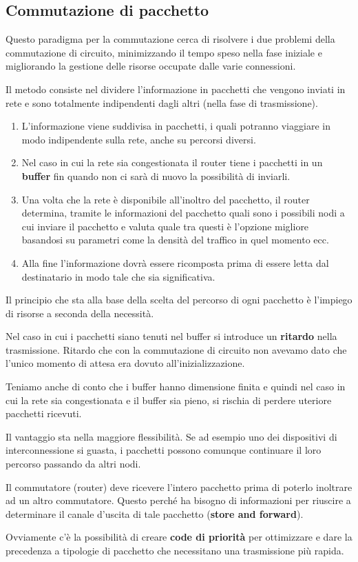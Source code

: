 \subsection{Commutazione di pacchetto}
Questo paradigma per la commutazione cerca di risolvere i due problemi della commutazione di
circuito, minimizzando il tempo speso nella fase iniziale e migliorando la gestione delle risorse
occupate dalle varie connessioni.

Il metodo consiste nel dividere l'informazione in pacchetti che vengono inviati in rete e sono
totalmente indipendenti dagli altri (nella fase di trasmissione).
\begin{enumerate}
	\item L'informazione viene suddivisa in pacchetti, i quali potranno viaggiare in modo
		indipendente sulla rete, anche su percorsi diversi.
	\item Nel caso in cui la rete sia congestionata il router tiene i pacchetti in un
		\textbf{buffer} fin quando non ci sarà di nuovo la possibilità di inviarli.
	\item Una volta che la rete è disponibile all'inoltro del pacchetto, il router determina,
		tramite le informazioni del pacchetto quali sono i possibili nodi a cui inviare il
		pacchetto e valuta quale tra questi è l'opzione migliore basandosi su parametri come la 
		densità del traffico in quel momento ecc.
	\item Alla fine l'informazione dovrà essere ricomposta prima di essere letta dal destinatario
		in modo tale che sia significativa.
\end{enumerate}
Il principio che sta alla base della scelta del percorso di ogni pacchetto è l'impiego di risorse
a seconda della necessità.

Nel caso in cui i pacchetti siano tenuti nel buffer si introduce un \textbf{ritardo} nella
trasmissione. Ritardo che con la commutazione di circuito non avevamo dato che l'unico momento di
attesa era dovuto all'inizializzazione.

Teniamo anche di conto che i buffer hanno dimensione finita e quindi nel caso in cui la rete sia 
congestionata e il buffer sia pieno, si rischia di perdere uteriore pacchetti ricevuti.

Il vantaggio sta nella maggiore flessibilità. Se ad esempio uno dei dispositivi di interconnessione
si guasta, i pacchetti possono comunque continuare il loro percorso passando da altri nodi.

Il commutatore (router) deve ricevere l'intero pacchetto prima di poterlo inoltrare ad un altro
commutatore. Questo perché ha bisogno di informazioni per riuscire a determinare il canale d'uscita
di tale pacchetto (\textbf{store and forward}).

Ovviamente c'è la possibilità di creare \textbf{code di priorità} per ottimizzare e dare la
precedenza a tipologie di pacchetto che necessitano una trasmissione più rapida.

